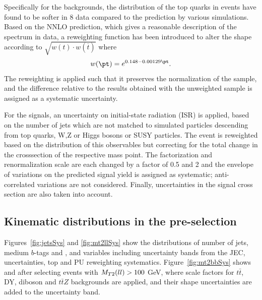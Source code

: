 Specifically for the backgrounds, the \pt distribution of the top quarks in \ttbar events have found to be softer in 8 \TeV data compared to the prediction by various simulations. 
Based on the NNLO prediction, which gives a reasonable description of the \pt spectrum in data,
a reweighting function has been introduced to alter the shape according to $\sqrt{w(t)\cdot w(\overline{t})}$ where
\begin{equation}
w(\pt) = e^{0.148-0.00129\pt}.
\end{equation}
The reweighting is applied such that it preserves the normalization of the sample, and the difference relative to the results obtained with the unweighted sample is assigned as a systematic uncertainty.

For the signals, an uncertainty on initial-state radiation (ISR) is applied, based on the number of jets which are not matched to simulated particles descending from top quarks, W,Z or Higgs bosons or SUSY particles. The event is reweighted based on the distribution of this observables but correcting for the total change in the crosssection of the respective mass point.
The factorization and renormalization scale are each changed by a factor of 0.5 and 2 and the envelope of variations on the predicted signal yield is assigned as systematic; anti-correlated variations
are not considered.
Finally, uncertainties in the signal cross section are also taken into account.

\subsection{Kinematic distributions in the pre-selection}
\label{sec:preselectionplots}
Figures~\ref{fig:jetsSys} and \ref{fig:mt2llSys} show the distributions of number of jets, medium $b$-tags and \mtll, \mtbb and \mtlblb variables including uncertainty bands from the JEC, \ETmiss uncertainties, top \pt and PU reweighting systematics.
Figure~\ref{fig:mt2bbSys} shows \mtbb and \mtlblb after selecting events with $M_{T2}(ll) > 100$ GeV, where scale factors for $t\bar{t}$, DY, diboson and $t\bar{t}Z$ backgrounds are applied, and their shape uncertainties
are added to the uncertainty band.

